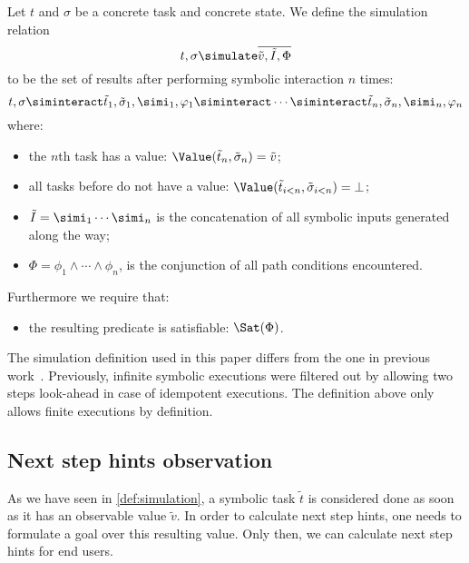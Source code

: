 \begin{definition}[Simulation]
  \label{def:simulation}
  Let $t$ and $\sigma$ be a concrete task and concrete state.
  We define the simulation relation
  \begin{equation*}
    t,\sigma \simulate \overline{\tilde{v},\tilde{I},\Phi}
  \end{equation*}
  to be the set of results after performing symbolic interaction $n$ times:
  \begin{equation*}
      t,\sigma
        \siminteract \tilde{t}_1,\tilde{\sigma}_1,\simi_1,\phi_1
        \siminteract \cdots
        \siminteract \tilde{t}_n,\tilde{\sigma}_n,\simi_n,\phi_n
  \end{equation*}
  where:
  \begin{itemize}
    \item the $n$th task has a value: $\Value(\tilde{t}_n,\tilde{\sigma}_n) = \tilde{v}$;
    \item all tasks before do not have a value: $\Value(\tilde{t}_{i<n},\tilde{\sigma}_{i<n}) = \bot$;
    \item $\tilde{I} = \simi_1 \cdots \simi_n$ is the concatenation of all symbolic inputs generated along the way;
    \item $\Phi = \phi_1 \land \cdots \land \phi_n$, is the conjunction of all path conditions encountered.
  \end{itemize}
  Furthermore we require that:
  \begin{itemize}
    \item the resulting predicate is satisfiable: $\Sat(\Phi)$.
  \end{itemize}
\end{definition}

The simulation definition used in this paper differs from the one in previous work~\cite{Naus2019}.
Previously, infinite symbolic executions were filtered out by allowing two steps look-ahead in case of idempotent executions.
The definition above only allows finite executions by definition.



\subsection{Next step hints observation}
\label{sub:hints}

As we have seen in \cref{def:simulation}, a symbolic task $\tilde{t}$ is considered done as soon as it has an observable value $\tilde{v}$.
In order to calculate next step hints, one needs to formulate a goal over this resulting value.
Only then, we can calculate next step hints for end users.

